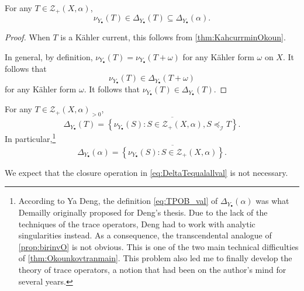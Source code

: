 \begin{corollary}\label{cor:valuationcurrentinPOB}
For any $T\in \mathcal{Z}_+(X,\alpha)$,
\[
\nu_{Y_{\bullet}}(T)\in \Delta_{Y_{\bullet}}(T)\subseteq \Delta_{Y_{\bullet}}(\alpha).
\]
\end{corollary}
\begin{proof}
    When $T$ is a Kähler current, this follows from \cref{thm:KahcurrminOkoun}.

    In general, by definition, $\nu_{Y_{\bullet}}(T)=\nu_{Y_{\bullet}}(T+\omega)$ for any Kähler form $\omega$ on $X$. It follows that
    \[
    \nu_{Y_{\bullet}}(T)\in \Delta_{Y_{\bullet}}(T+\omega)
    \]
    for any Kähler form $\omega$. It follows that $\nu_{Y_{\bullet}}(T)\in \Delta_{Y_{\bullet}}(T)$.
\end{proof}


\begin{theorem}\label{thm:Deltapartialint}
    For any $T\in \mathcal{Z}_+(X,\alpha)_{>0}$,
    \begin{equation}\label{eq:DeltaTequalallval}
    \Delta_{Y_{\bullet}}(T)=\overline{\left\{\nu_{Y_{\bullet}}(S):S\in \mathcal{Z}_+(X,\alpha),S\preceq_{\mathcal{I}}T\right\}}.
    \end{equation}
    In particular,\footnote{According to Ya Deng, the definition \eqref{eq:TPOB_val} of $\Delta_{Y_{\bullet}}(\alpha)$ was what Demailly originally proposed for Deng's thesis. Due to the lack of the techniques of the trace operators, Deng had to work with analytic singularities instead. As a consequence, the transcendental analogue of \cref{prop:birinvO} is not obvious. This is one of the two main technical difficulties of \cref{thm:Okounkovtranmain}. This problem also led me to finally develop the theory of trace operators, a notion that had been on the author's mind for several years.}
    \begin{equation}\label{eq:TPOB_val}
    \Delta_{Y_{\bullet}}(\alpha)=\overline{\left\{\nu_{Y_{\bullet}}(S):S\in \mathcal{Z}_+(X,\alpha)\right\}}.
    \end{equation}
\end{theorem}

\begin{remark}\label{rmk:Okounkov:L1841}
We expect that the closure operation in \eqref{eq:DeltaTequalallval} is not necessary.
\end{remark}


